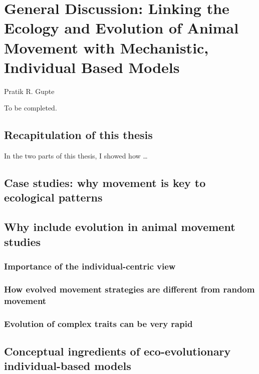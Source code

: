 
{}%
\chapter{General Discussion: Linking the Ecology and Evolution of Animal Movement with Mechanistic, Individual Based Models}\label{ch:discussion}

{{Pratik R. Gupte}}

To be completed.

\newrefcontext[sorting=ynt]

\section*{Recapitulation of this thesis}

In the two parts of this thesis, I showed how \ldots 

\section*{Case studies: why movement is key to ecological patterns}

\section*{Why include evolution in animal movement studies}

\subsection*{Importance of the individual-centric view}

\subsection*{How evolved movement strategies are different from random movement}

\subsection*{Evolution of complex traits can be very rapid}

\section*{Conceptual ingredients of eco-evolutionary individual-based models}

